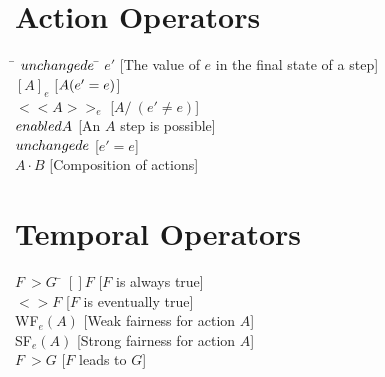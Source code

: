\documentclass[fleqn,leqno]{article}
\begin{document}

\section*{Action Operators}

{\centering
\begin{tabbing}
\hspace*{1em}\=\+\kill
$\UNCHANGED e$ \hspace{.5em} \=\kill
$e'$       \>     \small [The value of $e$ in the final state of a step] \\
$[A]_e$    \>    \small [$A \/ (e'=e)$] \\
$<<A>>_e $ \>    \small [$A /\ (e' \neq e)$] \\
$\ENABLED A$ \>  \small [An $A$ step is possible] \\
$\UNCHANGED e$ \> \small [$e'=e$] \\
$A\cdot B$   \>  \small [Composition of actions]
%
\end{tabbing}
}

\vspace{2em}
\section*{Temporal Operators}


{\centering
\begin{minipage}{\textwidth}
\begin{tabbing}
$F ~> G$ \hspace{.5em} \=\kill
$[]F$    \> \small [$F$ is always true] \\
$<>F$    \> \small  [$F$ is eventually true] \\
WF$_{e}(A)$ \> \small [Weak fairness for action $A$]\\
SF$_{e}(A)$ \> \small [Strong fairness for action $A$]\\
$F ~> G$ \> \small [$F$ leads to $G$]
%
%
\end{tabbing}
\end{minipage}\par }
\end{document}
